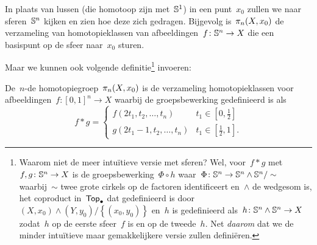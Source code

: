 \documentclass[a4paper,11pt]{article}
\begin{document}
In plaats van lussen (die homotoop zijn met~$\mathbb{S}^1$) in een punt~$x_0$ zullen we naar sferen~$\mathbb{S}^n$ kijken en zien hoe deze zich gedragen. Bijgevolg is~$\pi_n(X,x_0)$ de verzameling van homotopieklassen van afbeeldingen~$f\colon\mathbb{S}^n\to X$ die een basispunt op de sfeer naar~$x_0$ sturen.

Maar we kunnen ook volgende definitie\footnote{Waarom niet de meer intu\"itieve versie met sferen? Wel, voor~$f\ast g$ met~$f,g\colon\mathbb{S}^n\to X$ is de groepsbewerking~$\Phi\circ h$ waar~$\Phi\colon\mathbb{S}^n\to\mathbb{S}^n\wedge\mathbb{S}^n/\sim$ waarbij~$\sim$ twee grote cirkels op de factoren identificeert en~$\wedge$ de wedgesom is, het coproduct in~$\mathsf{Top}_{\bullet}$ dat gedefinieerd is door~$(X,x_0)\wedge(Y,y_0)/\left\{ (x_0,y_0) \right\}
$ en~$h$ is gedefinieerd als~$h\colon\mathbb{S}^n\wedge\mathbb{S}^n\to X$ zodat~$h$ op de eerste sfeer~$f$ is en op de tweede~$h$. Net \emph{daarom} dat we de minder intu\"itieve maar gemakkelijkere versie zullen defini\"eren.} invoeren:

\begin{definition}
  De~$n$\nobreakdash-de homotopiegroep~$\pi_n(X,x_0)$ is de verzameling homotopieklassen voor afbeeldingen~$f\colon[0,1]^n\to X$ waarbij de groepsbewerking gedefinieerd is als
  \begin{equation}
    f\ast g=
    \begin{cases}
      f(2t_1,t_2,\ldots,t_n) & t_1\in\left[ 0,\frac{1}{2} \right] \\
      g(2t_1-1,t_2,\ldots,t_n) & t_1\in\left[ \frac{1}{2},1 \right].
    \end{cases}
  \end{equation}
\end{definition}
\end{document}
